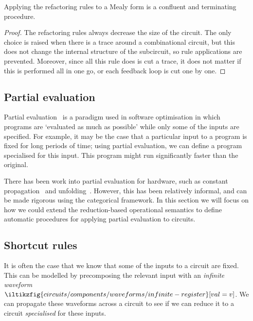 \documentclass{lmcs}
\begin{document}
\begin{prop}
    Applying the refactoring rules to a Mealy form is a confluent and
    terminating procedure.
\end{prop}
\begin{proof}
    The refactoring rules always decrease the size of the circuit.
    The only choice is raised when there is a trace around a combinational
    circuit, but this does not change the internal structure of the subcircuit,
    so rule applications are prevented.
    Moreover, since all this rule does is cut a trace, it does not matter if
    this is performed all in one go, or each feedback loop is cut one by one.
\end{proof}

\subsection{Partial evaluation}\label{sec:partial}

Partial evaluation~\cite{jones1996introduction} is a paradigm used in software
optimisation in which programs are `evaluated as much as possible' while only
some of the inputs are specified.
For example, it may be the case that a particular input to a program is fixed
for long periods of time; using partial evaluation, we can define a program
specialised for this input.
This program might run significantly faster than the original.

There has been work into partial evaluation for hardware, such as constant
propagation~\cite{singh1996expressing,singh1999partial} and
unfolding~\cite{thompson2006bitlevel}.
However, this has been relatively informal, and can be made rigorous using the
categorical framework.
In this section we will focus on how we could extend the reduction-based
operational semantics to define automatic procedures for applying partial
evaluation to circuits.

\subsection{Shortcut rules}\label{sec:shortcut}

It is often the case that we know that some of the inputs to a circuit are
fixed.
This can be modelled by precomposing the relevant input with an
\emph{infinite waveform} \(
\iltikzfig{circuits/components/waveforms/infinite-register}[val=v]
\).
We can propagate these waveforms across a circuit to see if we can reduce it to
a circuit \emph{specialised} for these inputs.
\end{document}
